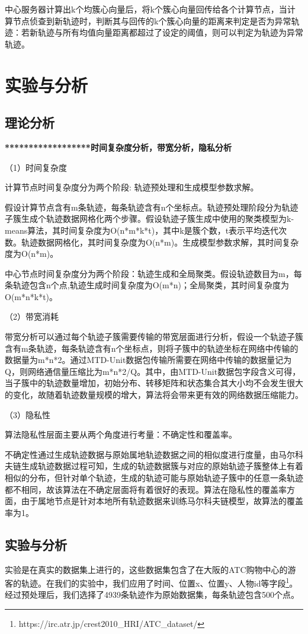 中心服务器计算出k个均簇心向量后，将k个簇心向量回传给各个计算节点，当计算节点侦查到新轨迹时，判断其与回传的k个簇心向量的距离来判定是否为异常轨迹：若新轨迹与所有均值向量距离都超过了设定的阈值，则可以判定为轨迹为异常轨迹。


\section{实验与分析}

\subsection{理论分析}

\textbf{******************时间复杂度分析，带宽分析，隐私分析}

（1）时间复杂度

计算节点时间复杂度分为两个阶段: 轨迹预处理和生成模型参数求解。

假设计算节点含有m条轨迹，每条轨迹含有n个坐标点。轨迹预处理阶段分为轨迹子簇生成个轨迹数据网格化两个步骤。假设轨迹子簇生成中使用的聚类模型为k-means算法，其时间复杂度为O(n*m*k*t)，其中k是簇个数，t表示平均迭代次数。轨迹数据网格化，其时间复杂度为O(n*m)。生成模型参数求解，其时间复杂度为O(n*m)。

中心节点时间复杂度分为两个阶段：轨迹生成和全局聚类。假设轨迹数目为m，每条轨迹包含n个点,轨迹生成时间复杂度为O(m*n)；全局聚类，其时间复杂度为O(m*n*k*t)。

（2）带宽消耗

带宽分析可以通过每个轨迹子簇需要传输的带宽层面进行分析，假设一个轨迹子簇含有m条轨迹，每条轨迹含有n个坐标点，则将子簇中的轨迹坐标在网络中传输的数据量为m*n*2。通过MTD-Unit数据包传输所需要在网络中传输的数据量记为Q，则网络通信量压缩比为m*n*2/Q。其中，由MTD-Unit数据包字段含义可得，当子簇中的轨迹数量增加，初始分布、转移矩阵和状态集合其大小均不会发生很大的变化，故随着轨迹数量规模的增大，算法将会带来更有效的网络数据压缩能力。

（3）隐私性

算法隐私性层面主要从两个角度进行考量：不确定性和覆盖率。

不确定性通过生成轨迹数据与原始属地轨迹数据之间的相似度进行度量，由马尔科夫链生成轨迹数据过程可知，生成的轨迹数据簇与对应的原始轨迹子簇整体上有着相似的分布，但针对单个轨迹，生成的轨迹可能与原始轨迹子簇中的任意一条轨迹都不相同，故该算法在不确定层面将有着很好的表现。算法在隐私性的覆盖率方面，由于属地节点是针对本地所有轨迹数据来训练马尔科夫链模型，故算法的覆盖率为1。

\subsection{实验与分析}
实验是在真实的数据集上进行的，这些数据集包含了在大阪的ATC购物中心的游客的轨迹。在我们的实验中，我们应用了时间、位置x、位置y、人物id等字段\footnote[1]{https://irc.atr.jp/crest2010_HRI/ATC_dataset/}。经过预处理后，我们选择了4939条轨迹作为原始数据集，每条轨迹包含500个点。

